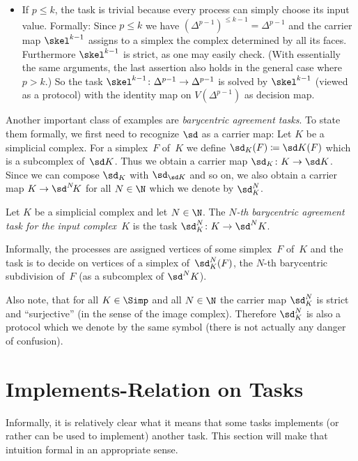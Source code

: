 \begin{thExample}
\begin{itemize}
        \item
            If $p\leq k$, the task is trivial because every process can simply
            choose its input value. Formally: Since $p\leq k$ we have
            $(\Delta^{p-1})^{\leq k-1} = \Delta^{p-1}$ and the carrier map
            $\skel^{k-1}$ assigns to a simplex the complex determined by all its
            faces. Furthermore $\skel^{k-1}$ is strict, as one may easily check.
            (With essentially the same arguments, the last assertion also holds
            in the general case where $p > k$.) So the task
            $\skel^{k-1}\colon\Delta^{p-1}\to\Delta^{p-1}$ is solved by
            $\skel^{k-1}$ (viewed as a protocol) with the identity map
            on $V(\Delta^{p-1})$ as decision map.
    \end{itemize}
\end{thExample}

Another important class of examples are \emph{barycentric agreement tasks}. To
state them formally, we first need to recognize $\sd$ as a carrier map:
Let $K$ be a simplicial complex. For a simplex~$F$ of~$K$ we define
$\sd_K(F) \defeq \sd K(F)$ which is a subcomplex of~$\sd K$. Thus we
obtain a carrier map $\sd_K\colon K\to\sd K$. Since we can compose
$\sd_K$ with $\sd_{\sd K}$ and so on, we also obtain a carrier map
$K\to\sd^N\!K$ for all $N\in\N$ which we denote by $\sd_K^N$.

\begin{thExample}
    \label{ch2:barycentricagreement}
    Let $K$ be a simplicial complex and let $N\in\N$. The
    \emph{$N$-th barycentric agreement task for the input complex~$K$}
    is the task $\sd_K^N\colon K\to\sd^N K$.
    
    Informally, the processes are assigned vertices of some simplex~$F$
    of~$K$ and the task is to decide on vertices of a simplex
    of~$\sd_K^N(F)$, the $N$-th barycentric subdivision of~$F$
    (as a subcomplex of $\sd^N K$).
\end{thExample}

Also note, that for all $K\in\Simp$ and all $N\in\N$ the carrier map
$\sd_K^N$ is strict and \enquote{surjective} (in the sense of the image
complex). Therefore $\sd_K^N$ is also a protocol which we denote by
the same symbol (there is not actually any danger of confusion).


\section{Implements-Relation on Tasks}
Informally, it is relatively clear what it means that some tasks implements
(or rather can be used to implement) another task. This section will make
that intuition formal in an appropriate sense.

